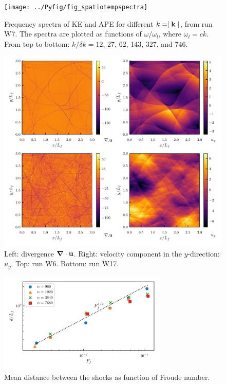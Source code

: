\begin{figure}
 \centerline{
 \texttt{[image: ../Pyfig/fig\_spatiotempspectra]}}
\caption{Frequency spectra of KE  and APE for different $ k = \mid {\bf k} \mid $, from run W7. The spectra are plotted  as functions of $\omega/\omega_l$, where
$\omega_l = c k$.  From top to bottom: $ k /\delta k
= 12$, 27, 62, 143, 327, and 746.  }
\label{fig_spatiotemp_spectra}
\end{figure}
\begin{figure}
 \centerline{
 \includegraphics[width=6.0in]{../Pyfig/fig_phys_fields_wave}}
\caption{Left: divergence $ \boldsymbol{\nabla} \cdot {\bf u} $. Right: velocity component in the $ y $-direction: $ u_y $. Top: run W6. Bottom: run W17.  }
\label{Physical}
\end{figure}
\begin{figure}
\centerline{\includegraphics[width=8cm]{../Pyfig/fig_shock_sep.pdf}}
\caption{Mean distance between the shocks as function of Froude number.  }
\label{fig_distance}
\end{figure}




